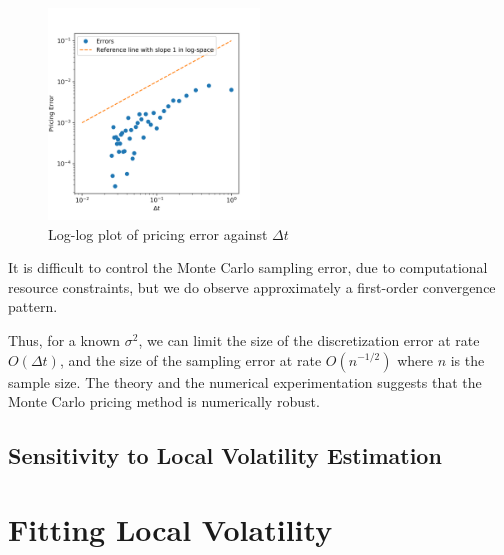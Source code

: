 \documentclass[12pt]{article}
\numberwithin{equation}{section}
\newcommand{\diff}[2]{\frac{\partial #1}{\partial #2}}
\begin{document}
\begin{figure}[h!]
    \centering
    \includegraphics[width=0.5\textwidth]{figs/montecarlo_discrete.png}
    \caption{Log-log plot of pricing error against $\Delta t$}
    \label{fig:log-log}
\end{figure}

It is difficult to control the Monte Carlo sampling error, due to computational
resource constraints, but we do observe approximately a first-order convergence
pattern. 
  
Thus, for a known $\sigma^2$, we can limit the size of the discretization error
at rate $O(\Delta t)$, and the size of the sampling error at rate $O(n^{-1/2})$
where $n$ is the sample size. The theory and the numerical experimentation
suggests that the Monte Carlo pricing method is numerically robust. 

\subsection{Sensitivity to Local Volatility Estimation}

\section{Fitting Local Volatility}
\label{sec:localvolfitting}



\end{document}
